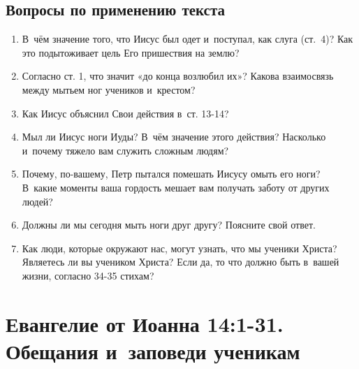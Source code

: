 \documentclass[a4paper,12pt]{article}
\begin{document}
\subsection*{Вопросы по применению текста} 
\begin{enumerate}
    \item В~чём значение того, что Иисус был одет и~поступал, как слуга (ст.~4)? Как это подытоживает цель Его пришествия на землю?
    
    \myline
    
    \myline
    \item Согласно ст. 1, что значит «до конца возлюбил их»? Какова взаимосвязь между мытьем ног учеников и~крестом? 
    
    \myline
    
    \myline
    \item Как Иисус объяснил Свои действия в~ст. 13-14? 
    
    \myline
    
    \myline
    \item Мыл ли Иисус ноги Иуды? В~чём значение этого действия? Насколько и~почему тяжело вам служить сложным людям? 
    
    \myline
    
    \myline
    \item Почему, по-вашему, Петр пытался помешать Иисусу омыть его ноги? В~какие моменты ваша гордость мешает вам получать заботу от других людей?
    
    \myline
    
    \myline
    \item Должны ли мы сегодня мыть ноги друг другу? Поясните свой ответ. 
    
    \myline
    
    \myline
    \item Как люди, которые окружают нас, могут узнать, что мы ученики Христа? Являетесь ли вы учеником Христа? Если да, то что должно быть в~вашей жизни, согласно 34-35 стихам? 
    
    \myline
    
    \myline
\end{enumerate}



\section{Евангелие от Иоанна 14:1-31. Обещания и~заповеди ученикам}
\end{document}

